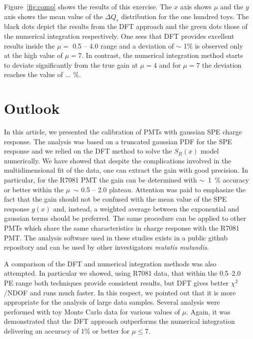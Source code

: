\documentclass[a4paper,11pt]{article}
\begin{document}
Figure~\ref{fig:comp} shows the results of this exercise. 
The $x$ axis shows $\mu$ and the $y$ axis shows the mean value of the $\Delta Q_s$ distribution for the one hundred toys. 
The black dots depict the results from the DFT approach and the green dots those of the numerical integration respectively. 
One sees that DFT provides excellent results inside the $\mu = $ 0.5 -- 4.0 range and a deviation of $\sim$ 1\% is observed only at the high value of $\mu=7$. 
In contrast, the numerical integration method starts to deviate significantly from the true gain at $\mu=4$ and for $\mu=7$ the deviation reaches the value of ... \%. 



\section{Outlook}
\label{sec:outro}

In this article, we presented the calibration of PMTs with gaussian SPE charge response. %
The analysis was based on a truncated gaussian PDF for the SPE response and we relied on the DFT method to solve the $S_R(x)$ model numerically. 
We have showed that despite the complications involved in the multidimensional fit of the data, one can extract the gain with good precision. 
In particular, for the R7081 PMT the gain can be determined with $\sim$~1~\% accuracy or better within the $\mu$~$\sim$ 0.5 -- 2.0 plateau. 
Attention was paid to emphasize the fact that the gain should not be confused with the mean value of the SPE response $g(x)$ and, instead, a weighted average between the exponential and gaussian terms should be preferred. 
The same procedure can be applied to other PMTs which share the same characteristics in charge response with the R7081 PMT. 
The analysis software used in these studies exists in a public github repository and can be used by other investigators \emph{mutatis mutandis}. 

A comparison of the DFT and numerical integration methods was also attempted. 
In particular we showed, using R7081 data, that within the 0.5--2.0 PE range both techniques provide consistent results, but DFT gives better $\chi^2$/NDOF and runs much faster. 
In this respect, we pointed out that it is more appropriate for the analysis of large data samples. 
Several analysis were performed with toy Monte Carlo data for various values of $\mu$. 
Again, it was demonstrated that the DFT approach outperforms the numerical integration delivering an accuracy of 1\% or better for $\mu\le 7 $. 
\end{document}
